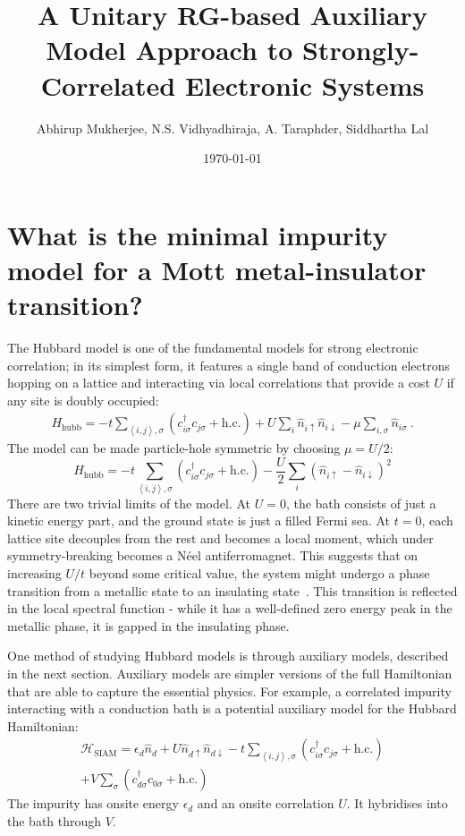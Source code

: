 \documentclass[reprint,hidelinks]{revtex4-2}
\begin{document}
\title{\bf A Unitary RG-based Auxiliary Model Approach to Strongly-Correlated Electronic Systems}
\author{Abhirup Mukherjee, N.S. Vidhyadhiraja, A. Taraphder, Siddhartha Lal}
\date{\today}
\maketitle
\tableofcontents

\section{What is the minimal impurity model for a Mott metal-insulator transition?}
The Hubbard model is one of the fundamental models for strong electronic correlation; in its simplest form, it features a single band of conduction electrons hopping on a lattice and interacting via local correlations that provide a cost \(U\) if any site is doubly occupied:
\begin{equation}\begin{aligned}
	H_\text{hubb} = -t\sum_{\left<i,j \right>,\sigma}\left(c^\dagger_{i\sigma}c_{j\sigma}+\text{h.c.}\right) + U\sum_i \hat n_{i \uparrow} \hat n_{i \downarrow} - \mu \sum_{i,\sigma}\hat n_{i\sigma}~.
\end{aligned}\end{equation}
The model can be made particle-hole symmetric by choosing \(\mu = U/2\):
\[H_\text{hubb} = -t\sum_{\left<i,j \right>,\sigma}\left(c^\dagger_{i\sigma}c_{j\sigma}+\text{h.c.}\right) - \frac{U}{2}\sum_i \left(\hat n_{i \uparrow} - \hat n_{i \downarrow}\right)^2\]
There are two trivial limits of the model. At \(U=0\), the bath consists of just a kinetic energy part, and the ground state is just a filled Fermi sea. At \(t=0\), each lattice site decouples from the rest and becomes a local moment, which under symmetry-breaking becomes a Néel antiferromagnet. This suggests that on increasing \(U/t\) beyond some critical value, the system might undergo a phase transition from a metallic state to an insulating state~\cite{Mott_1949}. This transition is reflected in the local spectral function - while it has a well-defined zero energy peak in the metallic phase, it is gapped in the insulating phase.

One method of studying Hubbard models is through auxiliary models, described in the next section. Auxiliary models are simpler versions of the full Hamiltonian that are able to capture the essential physics. For example, a correlated impurity interacting with a conduction bath is a potential auxiliary model for the Hubbard Hamiltonian:
\begin{equation}\begin{aligned}
\label{clus_bath_siam}
\mathcal{H}_\text{SIAM} = \epsilon_d \hat n_d + U \hat n_{d \uparrow} \hat n_{d \downarrow} - t\sum_{\left<i,j \right>, \sigma}\left(c^\dagger_{i\sigma}c_{j\sigma} + \text{h.c.}\right) \\
+ V\sum_\sigma \left( c^\dagger_{d\sigma}c_{0\sigma} + \text{h.c.}\right) 
\end{aligned}\end{equation}
The impurity has onsite energy \(\epsilon_d\) and an onsite correlation \(U\). It hybridises into the bath through \(V\).
\end{document}
